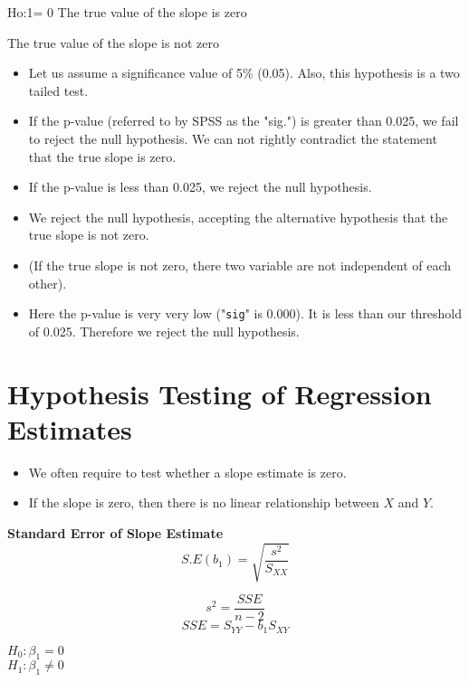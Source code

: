 \documentclass[]{report}
\begin{document}
		Ho:1= 0  	 The true value of the slope is zero
		
		
		The true value of the slope is not zero
		
		
		
		
		\begin{itemize}
			\item Let us assume a significance value of 5\% (0.05). Also, this hypothesis is a two tailed test. 
			
			\item If the p-value (referred to by SPSS as the "sig.") is greater than 0.025, we fail to reject the null hypothesis. We can not rightly contradict the statement that the true slope is zero.
			
			\item If the p-value is less than 0.025, we reject the null hypothesis.
			
			\item We reject the null hypothesis, accepting the alternative hypothesis that the true slope is not zero.
			
			\item (If the true slope is not zero, there two variable are not independent of each other).
			
			\item Here the p-value is very very low ("\texttt{sig}"  is 0.000). It is less than our threshold of 0.025. Therefore we reject the null hypothesis.
		\end{itemize}
	\section{Hypothesis Testing of Regression Estimates}

	\begin{itemize}
		\item We often require to test whether a slope estimate is zero.
		\item If the slope is zero, then there is no linear relationship between $X$ and $Y$.
	\end{itemize}
	
	\noindent \textbf{Standard Error of Slope Estimate}
	\[S.E(b_1) = \sqrt{\frac{s^2}{S_{XX}}} \]
	
	\[s^2 = \frac{SSE}{n-2} \]
	\[SSE = S_{YY}- b_1S_{XY}\]

	$H_0: \beta_1 = 0$\\
	$H_1: \beta_1 \neq 0$\\
	
\end{document}
